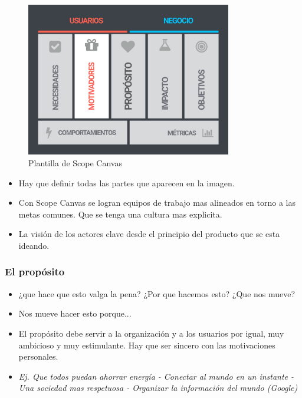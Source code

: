 \documentclass[titlepage,a4paper]{article}
\begin{document}
\begin{figure}[!htb]
    \centering
    \includegraphics[width=0.8\textwidth]{Imagenes/ScopeCanvas.jpg}
    \caption{Plantilla de Scope Canvas}
\end{figure}

\begin{itemize}
    \item Hay que definir todas las partes que aparecen en la imagen.
    \item Con Scope Canvas se logran equipos de trabajo mas alineados en torno a las metas comunes. Que se tenga una cultura mas explicita.
    \item La visión de los actores clave desde el principio del producto que se esta ideando.
\end{itemize}

\subsubsection*{El propósito}

\begin{itemize}
    \item ¿que hace que esto valga la pena? ¿Por que hacemos esto? ¿Que nos mueve?
    \item Nos mueve hacer esto porque...
    \item El propósito debe servir a la organización y a los usuarios por igual, muy ambicioso y muy estimulante. Hay que ser sincero con las motivaciones personales.
    \item \textit{Ej. Que todos puedan ahorrar energía - Conectar al mundo en un instante - Una sociedad mas respetuosa - Organizar la información del mundo (Google)}
\end{itemize}
\end{document}
